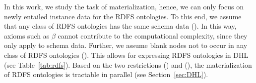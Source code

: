 In this work, we study the task of materialization, hence, we can only focus on
newly entailed instance data for the RDFS ontologies. To this end,
we assume that any class of RDFS ontologies has the same schema data (\uppercase\expandafter{}). In this way,
axioms such as $\beta$ cannot contribute to the computational complexity, since they
only apply to schema data. Further, we assume blank nodes not to occur in
any class of RDFS ontologies
(\uppercase\expandafter{}). This allows for expressing RDFS ontologies
in DHL (see Table~\ref{tab:rdfs}). Based on the two restrictions (\uppercase\expandafter{})
and (\uppercase\expandafter{}), the materialization of RDFS ontologies
is tractable in parallel (see Section~\ref{sec:DHL}).




